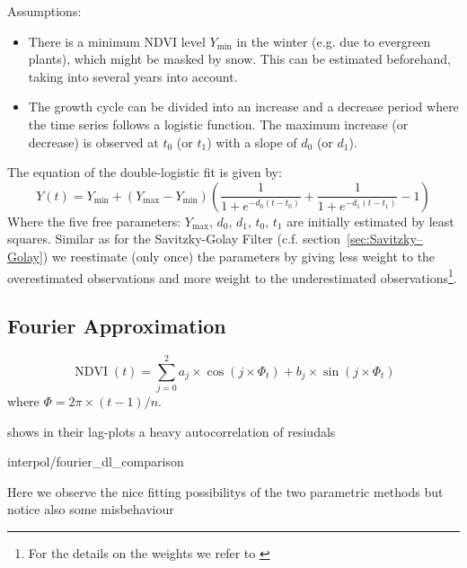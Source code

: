 Assumptions:
\begin{itemize}
    \item There is a minimum NDVI level $Y_{\min}$ in the winter (e.g. due to evergreen plants), which might be masked by snow. This can be estimated beforehand, taking into several years into account.
    \item The growth cycle can be divided into an increase and a decrease period where the time series follows a logistic function. The maximum increase (or decrease) is observed at $t_0$ (or $t_1$) with a slope of $d_0$ (or $d_1$).
\end{itemize}

The equation of the double-logistic fit is given by:
\begin{equation*}
    Y(t) = Y_{\min} + \left(Y_{\max}-Y_{\min}\right)\left(\frac{1}{1+e^{-d_0(t-t_0)}}+\frac{1}{1+e^{-d_1(t-t_1)}}-1\right)
\end{equation*}
Where the five free parameters: $Y_{\max}$, $d_0$, $d_1$, $t_0$, $t_1$ are initially estimated by least squares. Similar as for the Savitzky-Golay Filter (c.f. section~\ref{sec:Savitzky–Golay}) we reestimate (only once) the parameters by giving less weight to the overestimated observations and more weight to the underestimated observations\footnote{For the details on the weights we refer to \cite{beckImprovedMonitoringVegetation2006}}.

\subsection{Fourier Approximation}
\label{sec:fourier_approx}
$$
    \operatorname{NDVI}(t)=\sum_{j=0}^{2} a_{j} \times \cos \left(j \times \Phi_{t}\right)+b_{j} \times \sin \left(j \times \Phi_{t}\right)
$$
where $\Phi=2 \pi \times(t-1) / n$.

\cite{beckImprovedMonitoringVegetation2006} shows in their lag-plots a heavy autocorrelation of resiudals

\begin{my_figure}{interpol/fourier_dl_comparison}
    \caption{Here we observe the nice fitting possibilitys of the two parametric methods but notice also some misbehaviour}
\end{my_figure}


